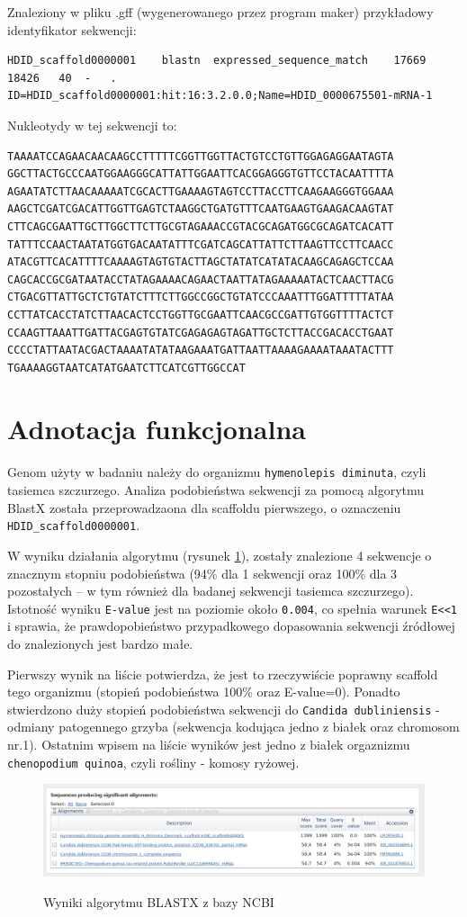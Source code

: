 \documentclass[a4paper]{article}
\begin{document}
Znaleziony w pliku .gff (wygenerowanego przez program maker) przykładowy identyfikator sekwencji:
\begin{lstlisting}
HDID_scaffold0000001	blastn	expressed_sequence_match	17669	18426	40	-	.	ID=HDID_scaffold0000001:hit:16:3.2.0.0;Name=HDID_0000675501-mRNA-1
\end{lstlisting}

Nukleotydy w tej sekwencji to:

\begin{verbatim}
TAAAATCCAGAACAACAAGCCTTTTTCGGTTGGTTACTGTCCTGTTGGAGAGGAATAGTA
GGCTTACTGCCCAATGGAAGGGCATTATTGGAATTCACGGAGGGTGTTCCTACAATTTTA
AGAATATCTTAACAAAAATCGCACTTGAAAAGTAGTCCTTACCTTCAAGAAGGGTGGAAA
AAGCTCGATCGACATTGGTTGAGTCTAAGGCTGATGTTTCAATGAAGTGAAGACAAGTAT
CTTCAGCGAATTGCTTGGCTTCTTGCGTAGAAACCGTACGCAGATGGCGCAGATCACATT
TATTTCCAACTAATATGGTGACAATATTTCGATCAGCATTATTCTTAAGTTCCTTCAACC
ATACGTTCACATTTTCAAAAGTAGTGTACTTAGCTATATCATATACAAGCAGAGCTCCAA
CAGCACCGCGATAATACCTATAGAAAACAGAACTAATTATAGAAAAATACTCAACTTACG
CTGACGTTATTGCTCTGTATCTTTCTTGGCCGGCTGTATCCCAAATTTGGATTTTTATAA
CCTTATCACCTATCTTAACACTCCTGGTTGCGAATTCAACGCCGATTGTGGTTTTACTCT
CCAAGTTAAATTGATTACGAGTGTATCGAGAGAGTAGATTGCTCTTACCGACACCTGAAT
CCCCTATTAATACGACTAAAATATATAAGAAATGATTAATTAAAAGAAAATAAATACTTT
TGAAAAGGTAATCATATGAATCTTCATCGTTGGCCAT
\end{verbatim}


\section{Adnotacja funkcjonalna}
Genom użyty w badaniu należy do organizmu \texttt{hymenolepis diminuta}, czyli tasiemca szczurzego.
Analiza podobieństwa sekwencji za pomocą algorytmu BlastX została przeprowadzaona dla scaffoldu pierwszego,
o oznaczeniu \texttt{HDID\_scaffold0000001}.

W wyniku działania algorytmu (rysunek \ref{fig:result}), zostały znalezione 4 sekwencje o znacznym stopniu podobieństwa
(94\% dla 1 sekwencji oraz 100\% dla 3 pozostałych -- w tym również dla badanej sekwencji tasiemca szczurzego).
Istotność wyniku \texttt{E-value} jest na poziomie około \texttt{0.004},
co spełnia warunek \texttt{E<<1} i sprawia, że prawdopobieństwo przypadkowego dopasowania
sekwencji źródłowej do znalezionych jest bardzo małe.

Pierwszy wynik na liście potwierdza, że jest to rzeczywiście poprawny scaffold tego organizmu
(stopień podobieństwa 100\% oraz E-value=0). Ponadto stwierdzono duży stopień podobieństwa sekwencji do \texttt{Candida dubliniensis} - odmiany
patogennego grzyba (sekwencja kodująca jedno z białek oraz chromosom nr.1). Ostatnim wpisem na liście wyników jest jedno z białek orgaznizmu
\texttt{chenopodium quinoa}, czyli rośliny - komosy ryżowej. 

\begin{figure}[h]
    \centering
    \includegraphics[width=1.0\textwidth]{result.png}
    \label{fig:result}
    \caption[]{Wyniki algorytmu BLASTX z bazy NCBI}
\end{figure}
\end{document}
